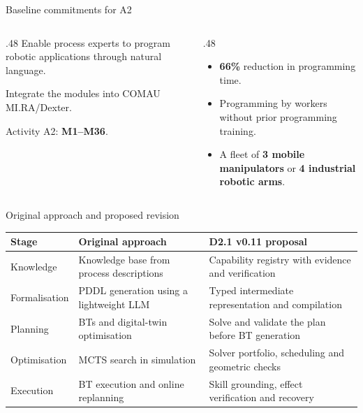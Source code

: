 \documentclass[aspectratio=169,11pt]{beamer}
\begin{document}
\begin{frame}{Baseline commitments for A2}
\begin{columns}[T]
\begin{column}{.48\textwidth}
Enable process experts to program robotic applications through natural language.\par
Integrate the modules into COMAU MI.RA/Dexter.\par
Activity A2: \textbf{M1--M36}.
\end{column}
\begin{column}{.48\textwidth}
\begin{itemize}\items
\item \textbf{66\%} reduction in programming time.
\item Programming by workers without prior programming training.
\item A fleet of \textbf{3 mobile manipulators} or \textbf{4 industrial robotic arms}.
\end{itemize}
\end{column}
\end{columns}
\end{frame}

\begin{frame}{Original approach and proposed revision}
\small\renewcommand{\arraystretch}{1.4}
\begin{tabularx}{\textwidth}{@{}p{}XX@{}}
\toprule
Stage & Original approach & D2.1 v0.11 proposal\\\midrule
Knowledge & Knowledge base from process descriptions & Capability registry with evidence and verification\\
Formalisation & PDDL generation using a lightweight LLM & Typed intermediate representation and compilation\\
Planning & BTs and digital-twin optimisation & Solve and validate the plan before BT generation\\
Optimisation & MCTS search in simulation & Solver portfolio, scheduling and geometric checks\\
Execution & BT execution and online replanning & Skill grounding, effect verification and recovery\\\bottomrule
\end{tabularx}
\end{frame}
\end{document}
